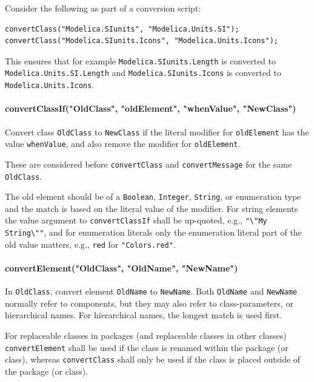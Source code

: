 \begin{example}
Consider the following as part of a conversion script:
\begin{lstlisting}[language=modelica]
convertClass("Modelica.SIunits", "Modelica.Units.SI");
convertClass("Modelica.SIunits.Icons", "Modelica.Units.Icons");
\end{lstlisting}
This ensures that for example \lstinline!Modelica.SIunits.Length! is converted to \lstinline!Modelica.Units.SI.Length! and \lstinline!Modelica.SIunits.Icons! is converted to \lstinline!Modelica.Units.Icons!.
\end{example}

\paragraph*{convertClassIf("OldClass", "oldElement", "whenValue", "NewClass")}\label{convertclassifoldclass-oldelement-whenvalue-newclass}

Convert class \lstinline!OldClass! to \lstinline!NewClass! if the literal modifier for \lstinline!oldElement! has the value \lstinline!whenValue!, and also remove the modifier for \lstinline!oldElement!.

These are considered before \lstinline!convertClass! and \lstinline!convertMessage! for the same \lstinline!OldClass!.

The old element should be of a \lstinline!Boolean!, \lstinline!Integer!, \lstinline!String!, or enumeration type and the match is based on the literal value of the modifier.
For string elements the value argument to \lstinline!convertClassIf! shall be up-quoted, e.g., \lstinline!"\"My String\""!, and for enumeration literals only the enumeration literal part of the old value matters, e.g., \lstinline!red! for \lstinline!"Colors.red"!.

\paragraph*{convertElement("OldClass", "OldName", "NewName")}\label{convertelementoldclassoldnamenewname}

In \lstinline!OldClass!, convert element \lstinline!OldName! to \lstinline!NewName!.
Both \lstinline!OldName! and \lstinline!NewName! normally refer to components, but they may also refer to class-parameters, or hierarchical names.
For hierarchical names, the longest match is used first.

For replaceable classes in packages (and replaceable classes in other classes) \lstinline!convertElement! shall be used if the class is renamed within the package (or class), whereas \lstinline!convertClass! shall only be used if the class is placed outside of the package (or class).

